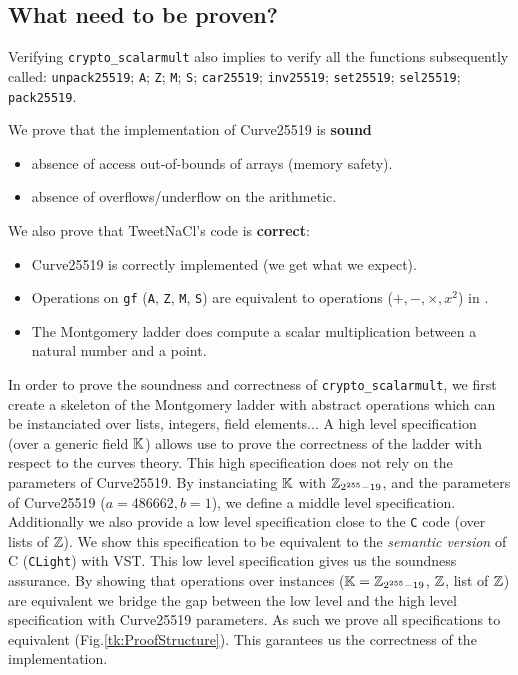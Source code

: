 \subsection{What need to be proven?}

Verifying \texttt{crypto\_scalarmult} also implies to verify all the functions
subsequently called: \texttt{unpack25519}; \texttt{A}; \texttt{Z}; \texttt{M};
\texttt{S}; \texttt{car25519}; \texttt{inv25519}; \texttt{set25519}; \texttt{sel25519};
\texttt{pack25519}.

We prove that the implementation of Curve25519 is \textbf{sound} \ie
\begin{itemize}
\item absence of access out-of-bounds of arrays (memory safety).
\item absence of overflows/underflow on the arithmetic.
\end{itemize}
We also prove that TweetNaCl's code is \textbf{correct}:
\begin{itemize}
\item Curve25519 is correctly implemented (we get what we expect).
\item Operations on \texttt{gf} (\texttt{A}, \texttt{Z}, \texttt{M}, \texttt{S})
are equivalent to operations ($+,-,\times,x^2$) in \Zfield.
\item The Montgomery ladder does compute a scalar multiplication between a natural number and a point.
\end{itemize}

In order to prove the soundness and correctness of \texttt{crypto\_scalarmult},
we first create a skeleton of the Montgomery ladder with abstract operations which
can be instanciated over lists, integers, field elements...
A high level specification (over a generic field $\mathbb{K}$) allows use to prove the
correctness of the ladder with respect to the curves theory.
This high specification does not rely on the parameters of Curve25519.
By instanciating $\mathbb{K}$ with $\mathbb{Z}_{2^{255}-19}$, and the parameters of Curve25519 ($a = 486662, b = 1$),
we define a middle level specification.
Additionally we also provide a low level specification close to the \texttt{C} code
(over lists of $\mathbb{Z}$). We show this specification to be equivalent to the
\textit{semantic version} of C (\texttt{CLight}) with VST.
This low level specification gives us the soundness assurance.
By showing that operations over instances ($\mathbb{K} = \mathbb{Z}_{2^{255}-19}$, $\mathbb{Z}$, list of $\mathbb{Z}$) are
equivalent we bridge the gap between the low level and the high level specification
with Curve25519 parameters.
As such we prove all specifications to equivalent (Fig.\ref{tk:ProofStructure}).
This garantees us the correctness of the implementation.

